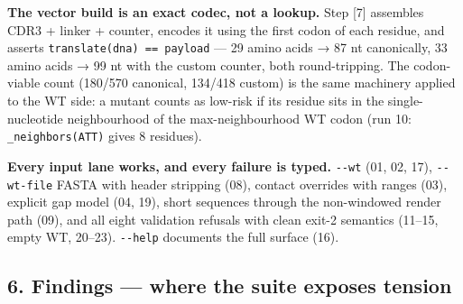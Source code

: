\textbf{The vector build is an exact codec, not a lookup.} Step {[}7{]}
assembles CDR3 + linker + counter, encodes it using the first codon of
each residue, and asserts \texttt{translate(dna)\ ==\ payload} --- 29
amino acids → 87 nt canonically, 33 amino acids → 99 nt with the custom
counter, both round-tripping. The codon-viable count (180/570 canonical,
134/418 custom) is the same machinery applied to the WT side: a mutant
counts as low-risk if its residue sits in the single-nucleotide
neighbourhood of the max-neighbourhood WT codon (run 10:
\texttt{\_neighbors(\textquotesingle{}ATT\textquotesingle{})} gives 8
residues).

\textbf{Every input lane works, and every failure is typed.}
\texttt{-\/-wt} (01, 02, 17), \texttt{-\/-wt-file} FASTA with header
stripping (08), contact overrides with ranges (03), explicit gap model
(04, 19), short sequences through the non-windowed render path (09), and
all eight validation refusals with clean exit-2 semantics (11--15, empty
WT, 20--23). \texttt{-\/-help} documents the full surface (16).

\hypertarget{findings-where-the-suite-exposes-tension}{%
\subsection{6. Findings --- where the suite exposes
tension}\label{findings-where-the-suite-exposes-tension}}

